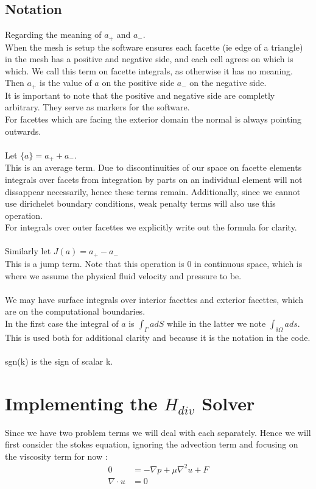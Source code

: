 \documentclass[11pt,twoside,a4paper]{article}
\begin{document}
\subsection{Notation}

Regarding the meaning of $a_+$ and $a_-$.\\
When the mesh is setup the software ensures each facette (ie edge of a triangle) in the mesh has a positive and negative side, and each cell agrees on which is which. We call this term on facette integrals, as otherwise it has no meaning. Then $a_+$ is the value of $a$ on the positive side $a_-$ on the negative side.\\
It is important to note that the positive and negative side are completly arbitrary. They serve as markers for the software.\\
For facettes which are facing the exterior domain the normal is always pointing outwards.\\
\\
Let $\{ a \} = a_+ + a_-$. \\
This is an average term. Due to discontinuities of our space on facette elements integrals over facets from integration by parts on an individual element will not dissappear necessarily, hence these terms remain. Additionally, since we cannot use dirichelet boundary conditions, weak penalty terms will also use this operation.\\

For integrals over outer facettes we explicitly write out the formula for clarity.\\
\\
Similarly let $J(a) = a_+ - a_-$\\
This is a jump term. Note that this operation is $0$ in continuous space, which is where we assume the physical fluid velocity and pressure to be.\\
\\
We may have surface integrals over interior facettes and exterior facettes, which are on the computational boundaries.\\
In the first case the integral of $a$ is $\int_\Gamma a dS$ while in the latter we note $\int_{\delta \Omega} a ds$.\\
This is used both for additional clarity and because it is the notation in the code.\\
\\
sgn(k) is the sign of scalar k.


\section{Implementing the $H_{div}$ Solver}
Since we have two problem terms we will deal with each separately. Hence we will first consider the stokes equation, ignoring the advection term and focusing on the viscosity term for now :
\begin{align}
0 &= -\nabla p + \mu \nabla^2 u + F  \\
\nabla \cdot u &= 0
\end{align}
\end{document}
